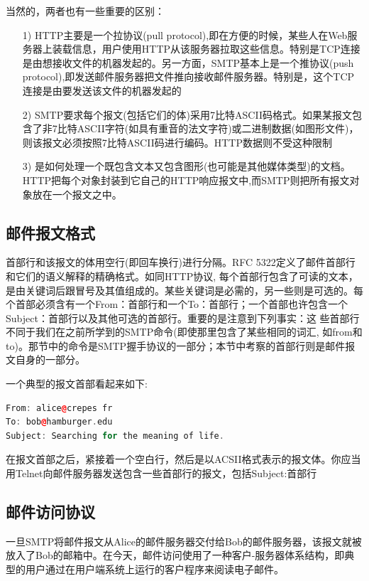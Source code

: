     当然的，两者也有一些重要的区别：

\begin{itemize}
    \item [1)] HTTP主要是一个拉协议(pull protocol),即在方便的时候，某些人在Web服务器上装载信息，用户使用HTTP从该服务器拉取这些信息。特别是TCP连接是由想接收文件的机器发起的。另一方面，SMTP基本上是一个推协议(push protocol),即发送邮件服务器把文件推向接收邮件服务器。特别是，这个TCP连接是由要发送该文件的机器发起的
    \item [2)] SMTP要求每个报文(包括它们的体)采用7比特ASCII码格式。如果某报文包含了非7比特ASCII字符(如具有重音的法文字符)或二进制数据(如图形文件)，则该报文必须按照7比特ASCII码进行编码。HTTP数据则不受这种限制
    \item [3)] 是如何处理一个既包含文本又包含图形(也可能是其他媒体类型)的文档。HTTP把每个对象封装到它自己的HTTP响应报文中,而SMTP则把所有报文对象放在一个报文之中。
\end{itemize}

\subsection{邮件报文格式}

    首部行和该报文的体用空行(即回车换行)进行分隔。RFC 5322定义了邮件首部行和它们的语义解释的精确格式。如同HTTP协议, 每个首部行包含了可读的文本，是由关键词后跟冒号及其值组成的。某些关键词是必需的，另一些则是可选的。每个首部必须含有一个From：首部行和一个To：首部行；一个首部也许包含一个Subject：首部行以及其他可选的首部行。重要的是注意到下列事实：这 些首部行不同于我们在之前所学到的SMTP命令(即使那里包含了某些相同的词汇, 如from和to)。那节中的命令是SMTP握手协议的一部分；本节中考察的首部行则是邮件报文自身的一部分。

    一个典型的报文首部看起来如下:

\begin{lstlisting}[language=C++]
From: alice@crepes fr
To: bob@hamburger.edu
Subject: Searching for the meaning of life.
\end{lstlisting}

    在报文首部之后，紧接着一个空白行，然后是以ACSII格式表示的报文体。你应当用Telnet向邮件服务器发送包含一些首部行的报文，包括Subject:首部行

\subsection{邮件访问协议}

    一旦SMTP将邮件报文从Alice的邮件服务器交付给Bob的邮件服务器，该报文就被放入了Bob的邮箱中。在今天，邮件访问使用了一种客户-服务器体系结构，即典型的用户通过在用户端系统上运行的客户程序来阅读电子邮件。

